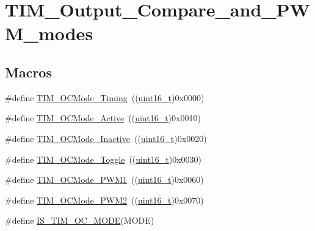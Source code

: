 \hypertarget{group___t_i_m___output___compare__and___p_w_m__modes}{}\section{T\+I\+M\+\_\+\+Output\+\_\+\+Compare\+\_\+and\+\_\+\+P\+W\+M\+\_\+modes}
\label{group___t_i_m___output___compare__and___p_w_m__modes}
\subsection*{Macros}
\begin{DoxyCompactItemize}
\item 
\#define \hyperlink{group___t_i_m___output___compare__and___p_w_m__modes_ga54d5745fade3b2f8ea1325e7447ca760}{T\+I\+M\+\_\+\+O\+C\+Mode\+\_\+\+Timing}~((\hyperlink{_p_e___types_8h_a1f1825b69244eb3ad2c7165ddc99c956}{uint16\+\_\+t})0x0000)
\item 
\#define \hyperlink{group___t_i_m___output___compare__and___p_w_m__modes_ga76bac57d41dc67218772f9c745c77102}{T\+I\+M\+\_\+\+O\+C\+Mode\+\_\+\+Active}~((\hyperlink{_p_e___types_8h_a1f1825b69244eb3ad2c7165ddc99c956}{uint16\+\_\+t})0x0010)
\item 
\#define \hyperlink{group___t_i_m___output___compare__and___p_w_m__modes_gae0c350d7adaea14a37cabc2ab762695f}{T\+I\+M\+\_\+\+O\+C\+Mode\+\_\+\+Inactive}~((\hyperlink{_p_e___types_8h_a1f1825b69244eb3ad2c7165ddc99c956}{uint16\+\_\+t})0x0020)
\item 
\#define \hyperlink{group___t_i_m___output___compare__and___p_w_m__modes_ga8b8adb6e81fe88bd14d44430f7f97021}{T\+I\+M\+\_\+\+O\+C\+Mode\+\_\+\+Toggle}~((\hyperlink{_p_e___types_8h_a1f1825b69244eb3ad2c7165ddc99c956}{uint16\+\_\+t})0x0030)
\item 
\#define \hyperlink{group___t_i_m___output___compare__and___p_w_m__modes_gaefbe32dddc9630fbcc48b302b50d15fc}{T\+I\+M\+\_\+\+O\+C\+Mode\+\_\+\+P\+W\+M1}~((\hyperlink{_p_e___types_8h_a1f1825b69244eb3ad2c7165ddc99c956}{uint16\+\_\+t})0x0060)
\item 
\#define \hyperlink{group___t_i_m___output___compare__and___p_w_m__modes_ga722d8f33a795ef82ed7ae76dfbb7613d}{T\+I\+M\+\_\+\+O\+C\+Mode\+\_\+\+P\+W\+M2}~((\hyperlink{_p_e___types_8h_a1f1825b69244eb3ad2c7165ddc99c956}{uint16\+\_\+t})0x0070)
\item 
\#define \hyperlink{group___t_i_m___output___compare__and___p_w_m__modes_ga93d898976e236c135bfd02a0c213c8ec}{I\+S\+\_\+\+T\+I\+M\+\_\+\+O\+C\+\_\+\+M\+O\+DE}(M\+O\+DE)

\end{DoxyCompactItemize}
